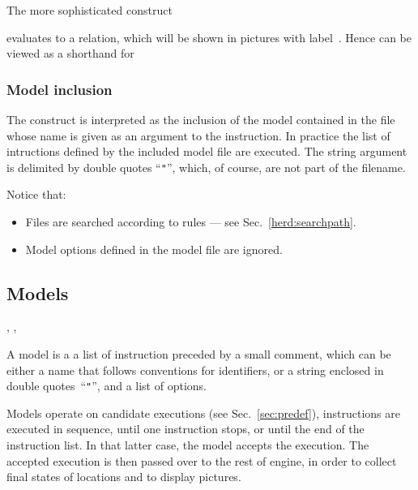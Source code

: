The more sophisticated construct
\begin{center}\end{center}
evaluates  to a relation, which will be shown in pictures with
label~.
Hence   can be viewed as a shorthand
for 

\subsubsection*{Model inclusion}
The construct  is interpreted as
the inclusion of the model contained in the file whose name is given as
an argument to the  instruction.
In practice the list of intructions defined by the included model file
are executed.
The string argument is delimited by double quotes ``\verb+"+'',
which, of course, are not part of the filename.


Notice that:
\begin{itemize}
\item Files are searched according to \herd{} rules --- see Sec.~\ref{herd:searchpath}.
\item Model options defined in the model file  are ignored.
\end{itemize}


\subsection{\label{language:model}Models}
\begin{syntax}
 \is {}  \brepet {} \erepet \brepet {} \erepet
\sep
{} \is {} \orelse  {}
\sep
{} \is {} \orelse {}
\orelse {} \orelse {}
\end{syntax}
A model is a a list of instruction preceded by a small comment,
which can be either a name that follows \herd{} conventions for identifiers,
or a string enclosed in double quotes~``\verb+"+'',
and a list of options.

Models operate on candidate executions
(see Sec.~\ref{sec:predef}),
instructions are executed in sequence,
until one instruction stops, or until the end of the instruction list.
In that latter case, the model accepts the execution.
The accepted execution is then passed over to the rest of \herd{}
engine, in order to collect final states of locations
and to display pictures.

